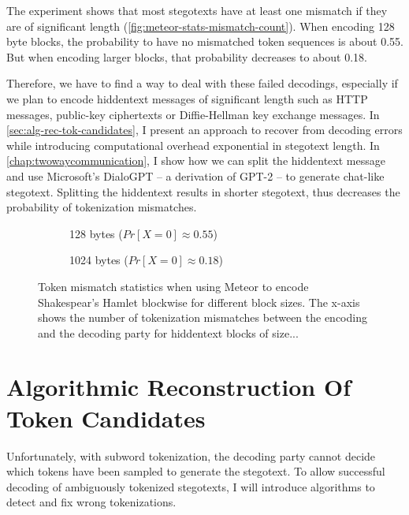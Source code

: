 The experiment shows that most stegotexts have at least one mismatch if they are of significant length (\autoref{fig:meteor-stats-mismatch-count}).
When encoding 128 byte blocks, the probability to have no mismatched token sequences is about 0.55.
But when encoding larger blocks, that probability decreases to about 0.18.

Therefore, we have to find a way to deal with these failed decodings, especially if we plan to encode hiddentext messages of significant length such as HTTP messages, public-key ciphertexts or Diffie-Hellman key exchange messages.
In \autoref{sec:alg-rec-tok-candidates}, I present an approach to recover from decoding errors while introducing computational overhead exponential in stegotext length. 
In \autoref{chap:twowaycommunication}, I show how we can split the hiddentext message and use Microsoft's DialoGPT -- a derivation of GPT-2 -- to generate chat-like stegotext.
Splitting the hiddentext results in shorter stegotext, thus decreases the probability of tokenization mismatches.

\begin{figure}[htbp]%
	\begin{subfigure}{.5\textwidth}%
		\centering%
	    \resizebox{0.8\linewidth}{!}{%
		}%
		\caption{128 bytes ($Pr[X=0] \approx 0.55$)}%
	\end{subfigure}%
	\begin{subfigure}{.5\textwidth}%
		\centering%
	    \resizebox{0.8\linewidth}{!}{%
		}%
		\caption{1024 bytes ($Pr[X=0] \approx 0.18$)}%
	\end{subfigure}%
	\caption{
	Token mismatch statistics when using Meteor to encode Shakespear's Hamlet blockwise for different block sizes.
	The x-axis shows the number of tokenization mismatches between the encoding and the decoding party for hiddentext blocks of size...}
	\label{fig:meteor-stats-mismatch-count}	
\end{figure}

\section{Algorithmic Reconstruction Of Token Candidates}
\label{sec:alg-rec-tok-candidates}

Unfortunately, with subword tokenization, the decoding party cannot decide which tokens have been sampled to generate the stegotext.
To allow successful decoding of ambiguously tokenized stegotexts, I will introduce algorithms to detect and fix wrong tokenizations.


